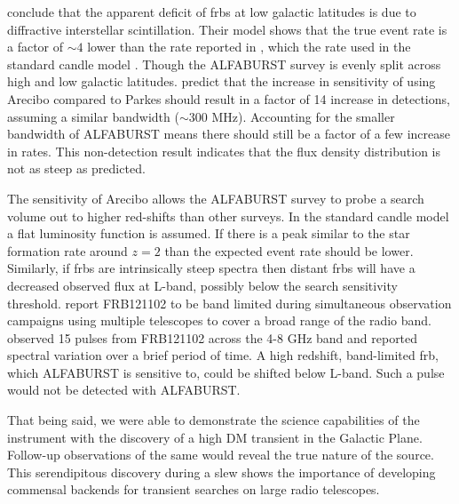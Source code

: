 \documentclass[a4paper,fleqn,usenatbib]{mnras}
\begin{document}
\cite{2015MNRAS.451.3278M} conclude that the apparent deficit of \glspl{frb} at
low galactic latitudes is due to diffractive interstellar scintillation. Their
model shows that the true event rate is a factor of $\sim 4$ lower than the rate
reported in \cite{2013Sci...341...53T}, which the rate used in the standard
candle model \citep{2013MNRAS.436L...5L}. Though the ALFABURST survey is evenly
split across high and low galactic latitudes.  \cite{2015MNRAS.451.3278M} predict
that the increase in sensitivity of using Arecibo compared to Parkes should
result in a factor of 14 increase in detections, assuming a similar bandwidth
($\sim 300$ MHz). Accounting for the smaller bandwidth of ALFABURST means there
should still be a factor of a few increase in rates. This non-detection result
indicates that the \cite{2015MNRAS.451.3278M} flux density distribution is not
as steep as predicted.

The sensitivity of Arecibo allows the ALFABURST survey to probe a search volume
out to higher red-shifts than other surveys. In the standard candle model a flat
luminosity function is assumed. If there is a peak similar to the star formation
rate around $z=2$ \citep{2014ARA&A..52..415M} than the expected event rate
should be lower. Similarly, if \glspl{frb} are intrinsically steep spectra then
distant \glspl{frb} will have a decreased observed flux at L-band, possibly
below the search sensitivity threshold. \cite{2017arXiv170507553L} report
FRB121102 to be band limited during simultaneous observation campaigns using
multiple telescopes to cover a broad range of the radio band. \cite{atel10675}
observed 15 pulses from FRB121102 across the 4-8 GHz band and reported spectral
variation over a brief period of time. A high redshift, band-limited \gls{frb},
which ALFABURST is sensitive to, could be shifted below L-band. Such a pulse
would not be detected with ALFABURST.

That being said, we were able to demonstrate the science capabilities of the 
instrument with the discovery of a high DM transient in the Galactic Plane. 
Follow-up observations of the same would reveal the true nature of 
the source. This serendipitous discovery during a slew shows the importance of 
developing commensal backends for transient searches on large radio telescopes.
\end{document}

